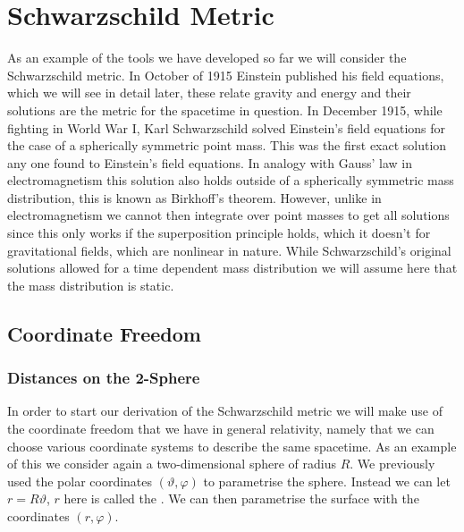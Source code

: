 \documentclass[fleqn]{NotesClass}
\begin{document}
    \chapter{Schwarzschild Metric}
    As an example of the tools we have developed so far we will consider the Schwarzschild metric.
    In October of 1915 Einstein published his field equations, which we will see in detail later, these relate gravity and energy and their solutions are the metric for the spacetime in question.
    In December 1915, while fighting in World War I, Karl Schwarzschild solved Einstein's field equations for the case of a spherically symmetric point mass.
    This was the first exact solution any one found to Einstein's field equations.
    In analogy with Gauss' law in electromagnetism this solution also holds outside of a spherically symmetric mass distribution, this is known as Birkhoff's theorem.
    However, unlike in electromagnetism we cannot then integrate over point masses to get all solutions since this only works if the superposition principle holds, which it doesn't for gravitational fields, which are nonlinear in nature.
    While Schwarzschild's original solutions allowed for a time dependent mass distribution we will assume here that the mass distribution is static.
    
    \section{Coordinate Freedom}
    \subsection{Distances on the 2-Sphere}
    In order to start our derivation of the Schwarzschild metric we will make use of the coordinate freedom that we have in general relativity, namely that we can choose various coordinate systems to describe the same spacetime.
    As an example of this we consider again a two-dimensional sphere of radius \(R\).
    We previously used the polar coordinates \((\vartheta, \varphi)\) to parametrise the sphere.
    Instead we can let \(r = R\vartheta\), \(r\) here is called the .
    We can then parametrise the surface with the coordinates \((r, \varphi)\).
    
\end{document}
